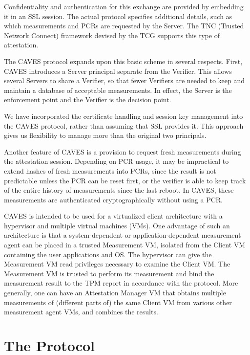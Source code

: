 \documentclass[titlepage,12pt]{article}
\theoremstyle{definition}
\begin{document}
Confidentiality and authentication for this exchange are provided by
embedding it in an SSL session. The actual protocol specifies
additional details, such as which measurements and PCRs are requested
by the Server. The TNC (Trusted Network Connect) framework devised by
the TCG supports this type of attestation.

The CAVES protocol expands upon this basic scheme in several respects.
First, CAVES introduces a Server principal separate from the
Verifier. This allows several Servers to share a Verifier, so that
fewer Verifiers are needed to keep and maintain a database of
acceptable measurements. In effect, the Server is the enforcement
point and the Verifier is the decision point.

We have incorporated the certificate handling and session key
management into the CAVES protocol, rather than assuming that SSL
provides it. This approach gives us flexibility to manage more than
the original two principals.

Another feature of CAVES is a provision to request fresh measurements
during the attestation session. Depending on PCR usage, it may be
impractical to extend hashes of fresh measurements into PCRs, since
the result is not predictable unless the PCR can be reset first, or
the verifier is able to keep track of the entire history of
measurements since the last reboot.  In CAVES, these measurements are
authenticated cryptographically without using a PCR.

CAVES is intended to be used for a virtualized client architecture with
a hypervisor and multiple virtual machines (VMs). One advantage of
such an architecture is that a system-dependent or
application-dependent measurement agent can be placed in a trusted
Measurement VM, isolated from the Client VM containing the user
applications and OS.  The hypervisor can give the Measurement VM read
privileges necessary to examine the Client VM. The Measurement VM is
trusted to perform its measurement and bind the measurement result to
the TPM report in accordance with the protocol.  More generally, one
can have an Attestation Manager VM that obtains multiple measurements
of (different parts of) the same Client VM from various other
measurement agent VMs, and combines the results.

\section{The Protocol}\label{sec:protocol}
\end{document}

